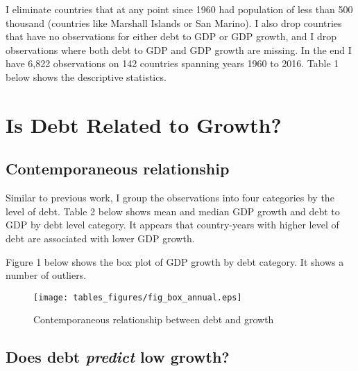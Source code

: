 \documentclass[letterpaper,11pt]{article}
\begin{document}
I eliminate countries that at any point since 1960 had population of less than 500 thousand (countries like Marshall Islands or San Marino). I also drop countries that have no observations for either debt to GDP or GDP growth, and I drop observations where both debt to GDP and GDP growth are missing. In the end I have 6,822 observations on 142 countries spanning years 1960 to 2016. Table 1 below shows the descriptive statistics.




\section{Is Debt Related to Growth?}
\subsection{Contemporaneous relationship}

Similar to previous work, I group the observations into four categories by the level of debt. Table 2 below shows mean and median GDP growth and debt to GDP by debt level category. It appears that country-years with higher level of debt are associated with lower GDP growth.



 Figure 1 below shows the box plot of GDP growth by debt category. It shows a number of outliers.

\begin{figure}[h!]
\centering
\texttt{[image: tables\_figures/fig\_box\_annual.eps]}
\caption{Contemporaneous relationship between debt and growth}
\end{figure}

\subsection{Does debt \emph{predict} low growth?}
\end{document}
